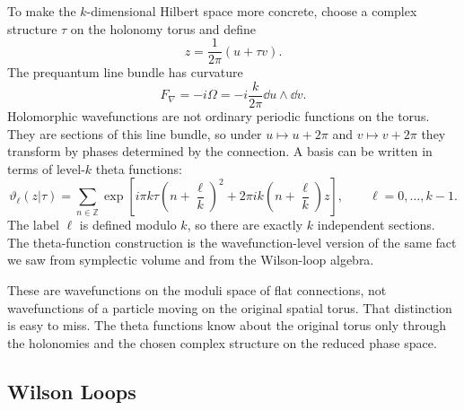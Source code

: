 To make the $k$-dimensional Hilbert space more concrete, choose a complex structure $\tau$ on the holonomy torus and define
\begin{equation}
  z=\frac{1}{2\pi}(u+\tau v).
  \label{eq:dense-z-coordinate}
\end{equation}
The prequantum line bundle has curvature
\begin{equation}
  F_{\nabla}=-i\Omega=-i\frac{k}{2\pi}\dd u\wedge\dd v.
  \label{eq:dense-prequantum-curvature}
\end{equation}
Holomorphic wavefunctions are not ordinary periodic functions on the torus. They are sections of this line bundle, so under $u\mapsto u+2\pi$ and $v\mapsto v+2\pi$ they transform by phases determined by the connection. A basis can be written in terms of level-$k$ theta functions:
\begin{equation}
  \vartheta_\ell(z|\tau)
  =
  \sum_{n\in\mathbb Z}
  \exp\left[
  i\pi k\tau\left(n+\frac{\ell}{k}\right)^2
  +
  2\pi i k\left(n+\frac{\ell}{k}\right)z
  \right],
  \qquad
  \ell=0,\ldots,k-1.
  \label{eq:dense-theta-functions}
\end{equation}
The label $\ell$ is defined modulo $k$, so there are exactly $k$ independent sections. The theta-function construction is the wavefunction-level version of the same fact we saw from symplectic volume and from the Wilson-loop algebra.

These are wavefunctions on the moduli space of flat connections, not wavefunctions of a particle moving on the original spatial torus. That distinction is easy to miss. The theta functions know about the original torus only through the holonomies and the chosen complex structure on the reduced phase space.

\subsection{Wilson Loops}
\label{subsec:dense-abelian-wilson-gaussian}

